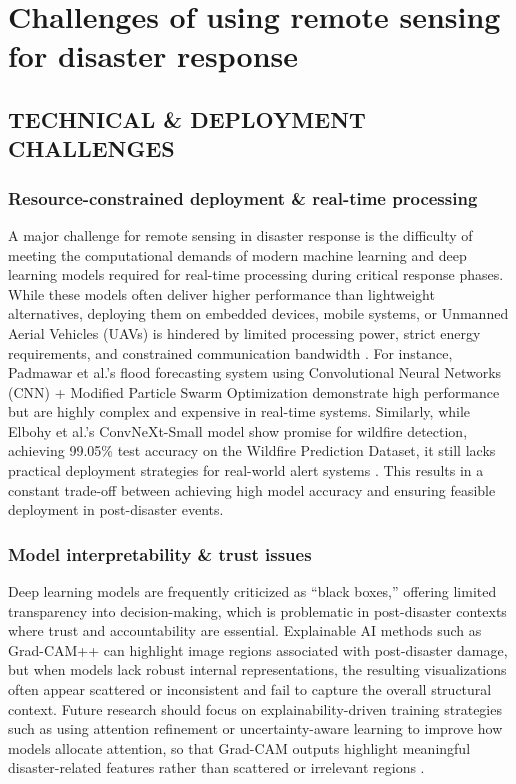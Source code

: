 \documentclass[conference,a4paper]{IEEEtran}
\begin{document}
\section{Challenges of using remote sensing for disaster response}


\subsection{TECHNICAL \& DEPLOYMENT CHALLENGES}

\subsubsection{\textbf{Resource-constrained deployment \& real-time processing}}
A major challenge for remote sensing in disaster response is the difficulty of meeting the computational demands of modern machine learning and deep learning models required for real-time processing during critical response phases. While these models often deliver higher performance than lightweight alternatives, deploying them on embedded devices, mobile systems, or Unmanned Aerial Vehicles (UAVs) is hindered by limited processing power, strict energy requirements, and constrained communication bandwidth \cite{elbohy2025fusion}. For instance, Padmawar et al.'s flood forecasting system using Convolutional Neural Networks (CNN) + Modified Particle Swarm Optimization demonstrate high performance but are highly complex and expensive in real-time systems. Similarly, while Elbohy et al.'s ConvNeXt-Small model show promise for wildfire detection, achieving 99.05\% test accuracy on the Wildfire Prediction Dataset, it still lacks practical deployment strategies for real-world alert systems \cite{elbohy2025fusion}. This results in a constant trade-off between achieving high model accuracy and ensuring feasible deployment in post-disaster events.

\subsubsection{\textbf{Model interpretability \& trust issues}}
Deep learning models are frequently criticized as ``black boxes,'' offering limited transparency into decision-making, which is problematic in post-disaster contexts where trust and accountability are essential. Explainable AI methods such as Grad-CAM++ can highlight image regions associated with post-disaster damage, but when models lack robust internal representations, the resulting visualizations often appear scattered or inconsistent and fail to capture the overall structural context. Future research should focus on explainability-driven training strategies such as using attention refinement or uncertainty-aware learning to improve how models allocate attention, so that Grad-CAM outputs highlight meaningful disaster-related features rather than scattered or irrelevant regions \cite{lagapEnhancingPostDisasterDamage2025}.
\end{document}
